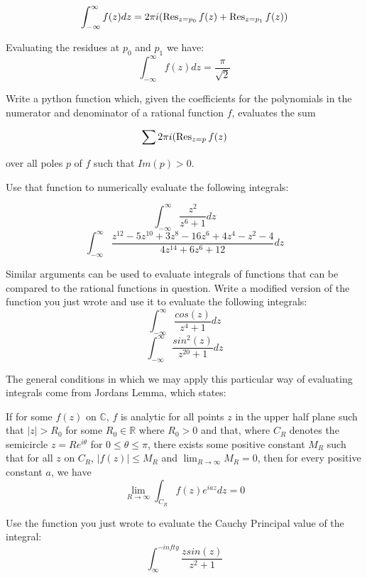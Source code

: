 \begin{equation*}
 \int_{-\infty}^{\infty} f(z) dz = 2\pi i (\operatorname{Res}_{z=p_0} f(z) +\operatorname{Res}_{z=p_1} f(z))
\end{equation*}

Evaluating the residues at $p_0$ and $p_1$ we have:
$$\int_{-\infty}^{\infty} f(z) dz = \frac{\pi}{\sqrt{2}}$$

\begin{problem}
Write a python function which, given the coefficients for the polynomials in the numerator and denominator of a rational function $f$, evaluates the sum

\begin{equation*}
\sum 2\pi i (\operatorname{Res}_{z=p} f(z)
\end{equation*}

over all poles $p$ of $f$ such that $Im(p)>0$.

Use that function to numerically evaluate the following integrals:

$$\int_{-\infty}^{\infty} \frac{z^2}{z^6+1}dz$$
$$\int_{-\infty}^{\infty} \frac{z^{12}-5z^{10}+3z^8-16z^6+4z^4-z^2-4}{4z^{14}+6z^6+12}dz$$

\end{problem}

\begin{problem}
Similar arguments can be used to evaluate integrals of functions that can be compared to the rational functions in question. Write a modified version of the function you just wrote and use it to evaluate the following integrals:
$$\int_{-\infty}^{\infty}\frac{cos(z)}{z^4+1}dz$$
$$\int_{-\infty}^{\infty}\frac{sin^2(z)}{z^{20}+1}dz$$
\end{problem}

The general conditions in which we may apply this particular way of evaluating integrals come from Jordans Lemma, which states:

If for some $f(z)$ on $\mathbb{C}$, $f$ is analytic for all points $z$ in the upper half plane such that $|z|>R_0$ for some $R_0 \in \mathbb{R}$ where $R_0 >0$ and that, where $C_R$ denotes the semicircle $z=Re^{i\theta}$ for $0\leq \theta \leq \pi$, there exists some positive constant $M_R$ such that for all $z$ on $C_R$, $|f(z)| \leq M_R$ and $\lim_{R \to \infty} M_R = 0$, then for every positive constant $a$, we have $$\lim_{R \to \infty} \int_{C_R} f(z) e^{iaz} dz = 0$$

\begin{problem}
Use the function you just wrote to evaluate the Cauchy Principal value of the integral:
$$\int_{\infty}^{-infty} \frac{z sin(z)}{z^2+1}$$
\end{problem}

